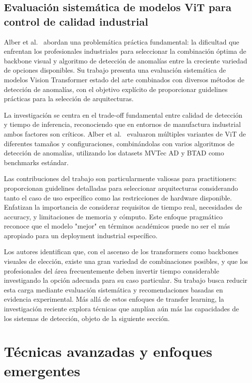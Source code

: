 \subsection{Evaluación sistemática de modelos ViT para control de calidad industrial}

Alber et al.~\cite{alber2024evaluating} abordan una problemática práctica fundamental: la dificultad que enfrentan los profesionales industriales para seleccionar la combinación óptima de backbone visual y algoritmo de detección de anomalías entre la creciente variedad de opciones disponibles. Su trabajo presenta una evaluación sistemática de modelos Vision Transformer estado del arte combinados con diversos métodos de detección de anomalías, con el objetivo explícito de proporcionar guidelines prácticas para la selección de arquitecturas.

La investigación se centra en el trade-off fundamental entre calidad de detección y tiempo de inferencia, reconociendo que en entornos de manufactura industrial ambos factores son críticos. Alber et al.~\cite{alber2024evaluating} evaluaron múltiples variantes de ViT de diferentes tamaños y configuraciones, combinándolas con varios algoritmos de detección de anomalías, utilizando los datasets MVTec AD y BTAD como benchmarks estándar.

Las contribuciones del trabajo son particularmente valiosas para practitioners: proporcionan guidelines detalladas para seleccionar arquitecturas considerando tanto el caso de uso específico como las restricciones de hardware disponible. Enfatizan la importancia de considerar requisitos de tiempo real, necesidades de accuracy, y limitaciones de memoria y cómputo. Este enfoque pragmático reconoce que el modelo "mejor" en términos académicos puede no ser el más apropiado para un deployment industrial específico.

Los autores identifican que, con el ascenso de los transformers como backbones visuales de elección, existe una gran variedad de combinaciones posibles, y que los profesionales del área frecuentemente deben invertir tiempo considerable investigando la opción adecuada para su caso particular. Su trabajo busca reducir esta carga mediante evaluación sistemática y recomendaciones basadas en evidencia experimental. Más allá de estos enfoques de transfer learning, la investigación reciente explora técnicas que amplían aún más las capacidades de los sistemas de detección, objeto de la siguiente sección.

\section{Técnicas avanzadas y enfoques emergentes}

